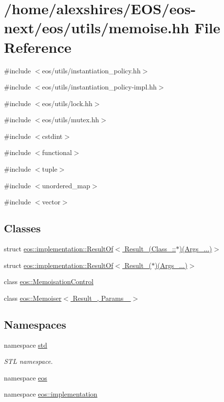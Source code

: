 \hypertarget{memoise_8hh}{
\section{/home/alexshires/EOS/eos-\/next/eos/utils/memoise.hh File Reference}
\label{memoise_8hh}
}
{\ttfamily \#include $<$eos/utils/instantiation\_\-policy.hh$>$}\par
{\ttfamily \#include $<$eos/utils/instantiation\_\-policy-\/impl.hh$>$}\par
{\ttfamily \#include $<$eos/utils/lock.hh$>$}\par
{\ttfamily \#include $<$eos/utils/mutex.hh$>$}\par
{\ttfamily \#include $<$cstdint$>$}\par
{\ttfamily \#include $<$functional$>$}\par
{\ttfamily \#include $<$tuple$>$}\par
{\ttfamily \#include $<$unordered\_\-map$>$}\par
{\ttfamily \#include $<$vector$>$}\par
\subsection*{Classes}
\begin{DoxyCompactItemize}
\item 
struct \hyperlink{structeos_1_1implementation_1_1ResultOf_3_01Result___07Class___1_1_5_08_07Args___8_8_8_08_4}{eos::implementation::ResultOf$<$ Result\_\-(Class\_\-::$\ast$)(Args\_\-...)$>$}
\item 
struct \hyperlink{structeos_1_1implementation_1_1ResultOf_3_01Result___07_5_08_07Args___8_8_8_08_4}{eos::implementation::ResultOf$<$ Result\_\-($\ast$)(Args\_\-...)$>$}
\item 
class \hyperlink{classeos_1_1MemoisationControl}{eos::MemoisationControl}
\item 
class \hyperlink{classeos_1_1Memoiser}{eos::Memoiser$<$ Result\_\-, Params\_\- $>$}
\end{DoxyCompactItemize}
\subsection*{Namespaces}
\begin{DoxyCompactItemize}
\item 
namespace \hyperlink{namespacestd}{std}


\begin{DoxyCompactList}\small\item\em STL namespace. \item\end{DoxyCompactList}\item 
namespace \hyperlink{namespaceeos}{eos}
\item 
namespace \hyperlink{namespaceeos_1_1implementation}{eos::implementation}
\end{DoxyCompactItemize}
